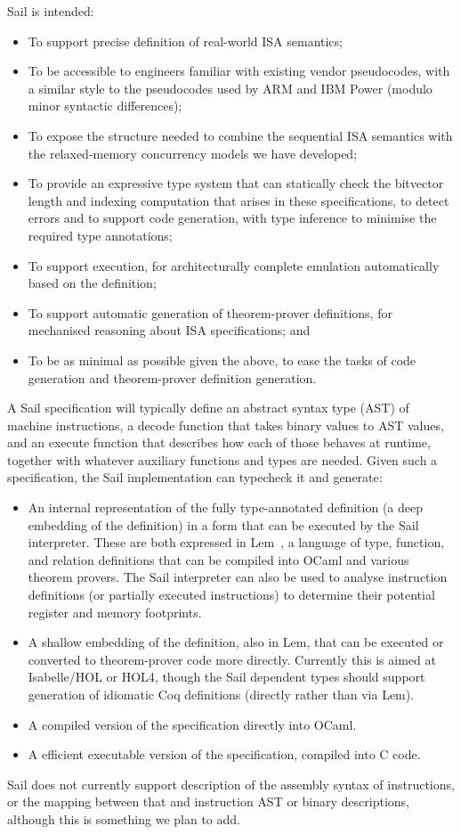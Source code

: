 Sail is intended:
\begin{itemize}
\item To support precise definition of real-world ISA semantics;
\item To be accessible to engineers familiar with existing vendor
  pseudocodes, with a similar style to the pseudocodes used by ARM and IBM Power
  (modulo minor syntactic differences);
\item To expose the structure needed to combine the sequential ISA
  semantics with the relaxed-memory concurrency models we have
  developed;
\item To provide an expressive type system that can statically check
  the bitvector length and indexing computation that arises in these
  specifications, to detect errors and to support code generation,
  with type inference to minimise the required type annotations;
\item To support execution, for architecturally complete emulation
  automatically based on the definition;
\item To support automatic generation of theorem-prover definitions, for
  mechanised reasoning about ISA specifications; and
\item To be as minimal as possible given the above, to ease the tasks
  of code generation and theorem-prover definition generation.
\end{itemize}

A Sail specification will typically define an abstract syntax type
(AST) of machine instructions, a decode function that takes binary
values to AST values, and an execute function that describes how each
of those behaves at runtime, together with whatever auxiliary
functions and types are needed.
%
Given such a specification, the Sail implementation can typecheck it
and generate:
\begin{itemize}
\item An internal representation of the fully type-annotated
  definition (a deep embedding of the definition) in a form that can
  be executed by the Sail interpreter.  These are both expressed in
  Lem~\cite{Lem-icfp2014,Lemcode}, a language of type, function, and
  relation definitions that can be compiled into OCaml and various
  theorem provers. The Sail interpreter can also be used to analyse
  instruction definitions (or partially executed instructions) to
  determine their potential register and memory footprints.
\item A shallow embedding of the definition, also in Lem, that can be
  executed or converted to theorem-prover code more directly.
Currently this is aimed at Isabelle/HOL or HOL4, though the Sail
dependent types should support generation of idiomatic Coq definitions
(directly rather than via Lem).
\item A compiled version of the specification
  directly into OCaml.
\item A efficient executable version of the specification, compiled
  into C code.
\end{itemize}
Sail does not currently support description of the assembly syntax of
instructions, or the mapping between that and instruction AST or
binary descriptions, although this is something we plan to add.

